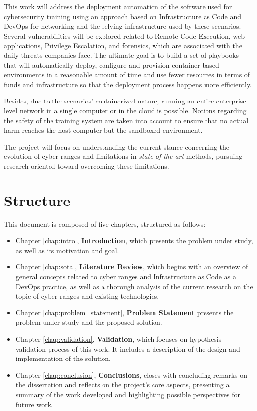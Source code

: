 This work will address the deployment automation of the software used for cybersecurity training using an approach based on Infrastructure as Code and DevOps for networking and the relying infrastructure used by these scenarios. Several vulnerabilities will be explored related to Remote Code Execution, web applications, Privilege Escalation, and forensics, which are associated with the daily threats companies face. The ultimate goal is to build a set of playbooks that will automatically deploy, configure and provision container-based environments in a reasonable amount of time and use fewer resources in terms of funds and infrastructure so that the deployment process happens more efficiently. 

Besides, due to the scenarios' containerized nature, running an entire enterprise-level network in a single computer or in the cloud is possible. Notions regarding the safety of the training system are taken into account to ensure that no actual harm reaches the host computer but the sandboxed environment. 

The project will focus on understanding the current stance concerning the evolution of cyber ranges and limitations in \textit{state-of-the-art} methods, pursuing research oriented toward overcoming these limitations.

\section{Structure} \label{sec:structure}

This document is composed of five chapters, structured as follows:

\begin{itemize}
    \item Chapter \ref{chap:intro}, \textbf{Introduction}, which presents the problem under study, as well as its motivation
and goal.
    \item Chapter \ref{chap:sota}, \textbf{Literature Review}, which begins with an overview of general concepts related to cyber ranges and Infrastructure as Code as a DevOps practice, as well as a thorough analysis of the current research on the topic of cyber ranges and existing technologies.
    \item Chapter \ref{chap:problem_statement}, \textbf{Problem Statement} presents the problem under study and the proposed solution.
    \item Chapter \ref{chap:validation}, \textbf{Validation}, which focuses on hypothesis validation process of this work. It includes a description of the design and implementation of the solution.
    \item Chapter \ref{chap:conclusion}, \textbf{Conclusions}, closes with concluding remarks on the dissertation and reflects on the project's core aspects, presenting a summary of the work developed and highlighting possible perspectives for future work.
\end{itemize}
